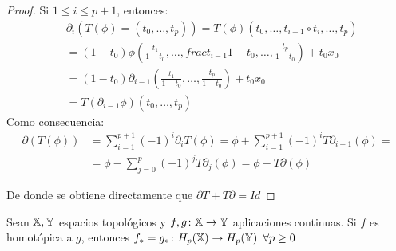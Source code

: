 \begin{proof}
  Si $1 \leq i \leq p+1$, entonces:
  \begin{align*}
    &\partial_i( T(\phi)=(t_0,\dots,t_p)) =  T(\phi)(t_0, \dots, t_{i-1} \circ t_i, \dots, t_p) \\
    &= (1-t_0)\phi(\frac{t_1}{1-t_0}, \dots, frac{t_{i-1}}{1-t_0}, \dots, \frac{t_p}{1-t_0}) + t_0 x_0 \\
    &= (1-t_0)\partial_{i-1}(\frac{t_1}{1-t_0}, \dots, \frac{t_p}{1-t_0}) + t_0 x_0 \\
    &=  T(\partial_{i-1} \phi)(t_0, \dots, t_p)
  \end{align*}
  Como consecuencia:
  \begin{align*}
    \partial( T(\phi)) &= \sum\limits_{i = 1}^{p+1} (-1)^i \partial_i  T(\phi) =
    \phi + \sum\limits_{i = 1}^{p+1} (-1)^i  T \partial_{i-1}(\phi) = \\
    &= \phi - \sum\limits_{j = 0}^p (-1)^j  T \partial_j(\phi) = \phi -  T \partial(\phi)
  \end{align*}

  De donde se obtiene directamente que $\partial  T +  T \partial = Id$
\end{proof}

\begin{theorem}
  Sean ${\mathbb X}, {\mathbb Y}$ espacios topológicos y $f, g \colon {\mathbb X} \to {\mathbb Y}$ aplicaciones continuas. Si $f$ es homotópica a $g$,
  entonces $f_* = g_* \colon H_p({\mathbb X}) \to H_p({\mathbb Y}) \hspace{0.5em} \forall p \geq 0$
\end{theorem}

